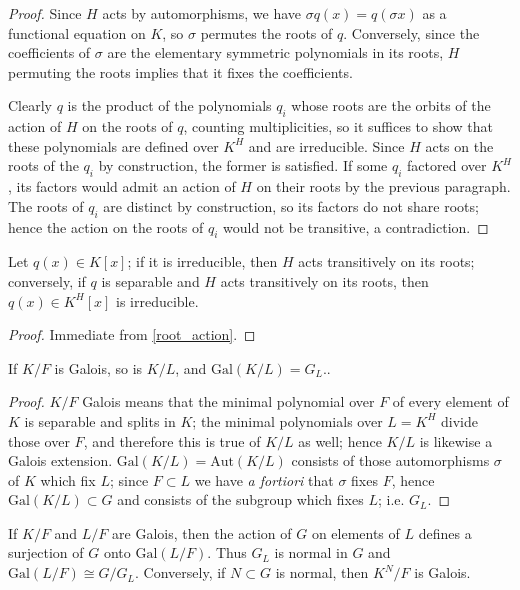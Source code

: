 \begin{proof} Since $H$ acts by automorphisms, we have $\sigma q(x) = q(\sigma
x)$ as a functional equation on $K$, so $\sigma$ permutes the roots of $q$.
Conversely, since the coefficients of $\sigma$ are the elementary symmetric
polynomials in its roots, $H$ permuting the roots implies that it fixes the
coefficients.

Clearly $q$ is the product of the polynomials $q_i$ whose roots are the orbits
of the action of $H$ on the roots of $q$, counting multiplicities, so it
suffices to show that these polynomials are defined over $K^H$ and are
irreducible. Since $H$ acts on the roots of the $q_i$ by construction, the
former is satisfied. If some $q_i$ factored over $K^H$, its factors would
admit an action of $H$ on their roots by the previous paragraph. The roots of
$q_i$ are distinct by construction, so its factors do not share roots; hence
the action on the roots of $q_i$ would not be transitive, a contradiction.
\end{proof}

\begin{lemma} Let $q(x) \in K[x]$; if it is irreducible, then $H$ acts
transitively on its roots; conversely, if $q$ is separable and $H$ acts
transitively on its roots, then $q(x) \in K^H[x]$ is irreducible.
\label{sep_irred}
\end{lemma}

\begin{proof} Immediate from \ref{root_action}. \end{proof}

\begin{lemma} If $K/F$ is Galois, so is $K/L$, and $\text{Gal}(K/L) = G_L$..
\label{sub_galois}
\end{lemma}

\begin{proof} $K/F$ Galois means that the minimal polynomial over $F$ of every
element of $K$ is separable and splits in $K$; the minimal polynomials over $L
= K^H$ divide those over $F$, and therefore this is true of $K/L$ as well;
hence $K/L$ is likewise a Galois extension. $\text{Gal}(K/L) = \text{Aut}(K/L)$ consists
of those automorphisms $\sigma$ of $K$ which fix $L$; since $F \subset L$ we
have \emph{a fortiori} that $\sigma$ fixes $F$, hence $\text{Gal}(K/L) \subset G$
and consists of the subgroup which fixes $L$; i.e. $G_L$. \end{proof}

\begin{lemma} If $K/F$ and $L/F$ are Galois, then the action of $G$ on
elements of $L$
defines a surjection of $G$ onto $\text{Gal}(L/F)$. Thus $G_L$ is normal in $G$ and
$\text{Gal}(L/F) \cong G/G_L$. Conversely, if $N \subset G$ is normal, then $K^N/F$
is Galois.
\label{normal}
\end{lemma}

